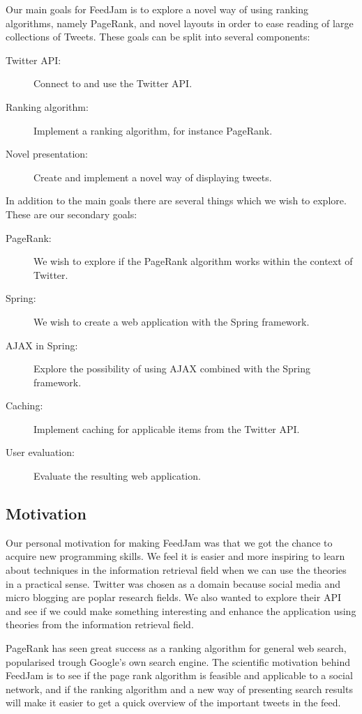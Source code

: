 Our main goals for FeedJam is to explore a novel way of using ranking algorithms, namely PageRank, and novel layouts in order to ease reading of large collections of Tweets. These goals can be split into several components:

\begin{description}
  \item[Twitter API:] Connect to and use the Twitter API.
  \item[Ranking algorithm:] Implement a ranking algorithm, for instance PageRank.
  \item[Novel presentation:] Create and implement a novel way of displaying tweets.
\end{description}

In addition to the main goals there are several things which we wish to explore. These are our secondary goals:

\begin{description}
  \item[PageRank:] We wish to explore if the PageRank algorithm works within the context of Twitter.
  \item[Spring:] We wish to create a web application with the Spring framework.
  \item[AJAX in Spring:] Explore the possibility of using AJAX combined with the Spring framework.
  \item[Caching:] Implement caching for applicable items from the Twitter API.
  \item[User evaluation:] Evaluate the resulting web application.
\end{description}

\subsection{Motivation} %
Our personal motivation for making FeedJam was that we got the chance to acquire new programming skills. We feel it is easier and more inspiring to learn about techniques in the information retrieval field when we can use the theories in a practical sense. Twitter was chosen as a domain because social media and micro blogging are poplar research fields. We also wanted to explore their API and see if we could make something interesting and enhance the application using theories from the information retrieval field.

PageRank has seen great success as a ranking algorithm for general web search, popularised trough Google's own search engine. The scientific motivation behind FeedJam is to see if the page rank algorithm is feasible and applicable to a social network, and if the ranking algorithm and a new way of presenting search results will make it easier to get a quick overview of the important tweets in the feed.